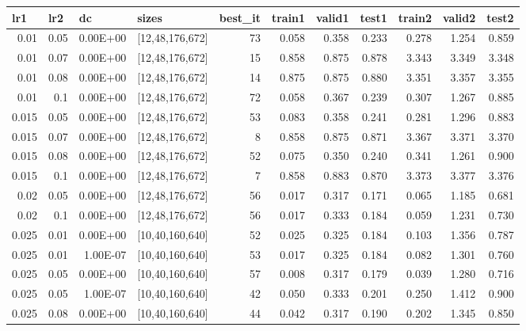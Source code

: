 \begin{table}[f]
\label{tab:results}
\small
\begin{tabular}{@{}rrrrrrrrrrr@{}}
\toprule
\multicolumn{1}{l}{lr1} & \multicolumn{1}{l}{lr2} & \multicolumn{1}{l}{dc} & \multicolumn{1}{l}{sizes} & \multicolumn{1}{l}{best\_it} & \multicolumn{1}{l}{train1} & \multicolumn{1}{l}{valid1} & \multicolumn{1}{l}{test1} & \multicolumn{1}{l}{train2} & \multicolumn{1}{l}{valid2} & \multicolumn{1}{l}{test2} \\ \midrule
0.01 & 0.05 & 0.00E+00 & {[}12,48,176,672{]} & 73 & 0.058 & 0.358 & 0.233 & 0.278 & 1.254 & 0.859 \\
0.01 & 0.07 & 0.00E+00 & {[}12,48,176,672{]} & 15 & 0.858 & 0.875 & 0.878 & 3.343 & 3.349 & 3.348 \\
0.01 & 0.08 & 0.00E+00 & {[}12,48,176,672{]} & 14 & 0.875 & 0.875 & 0.880 & 3.351 & 3.357 & 3.355 \\
0.01 & 0.1 & 0.00E+00 & {[}12,48,176,672{]} & 72 & 0.058 & 0.367 & 0.239 & 0.307 & 1.267 & 0.885 \\
0.015 & 0.05 & 0.00E+00 & {[}12,48,176,672{]} & 53 & 0.083 & 0.358 & 0.241 & 0.281 & 1.296 & 0.883 \\
0.015 & 0.07 & 0.00E+00 & {[}12,48,176,672{]} & 8 & 0.858 & 0.875 & 0.871 & 3.367 & 3.371 & 3.370 \\
0.015 & 0.08 & 0.00E+00 & {[}12,48,176,672{]} & 52 & 0.075 & 0.350 & 0.240 & 0.341 & 1.261 & 0.900 \\
0.015 & 0.1 & 0.00E+00 & {[}12,48,176,672{]} & 7 & 0.858 & 0.883 & 0.870 & 3.373 & 3.377 & 3.376 \\
0.02 & 0.05 & 0.00E+00 & {[}12,48,176,672{]} & 56 & 0.017 & 0.317 & 0.171 & 0.065 & 1.185 & 0.681 \\
0.02 & 0.1 & 0.00E+00 & {[}12,48,176,672{]} & 56 & 0.017 & 0.333 & 0.184 & 0.059 & 1.231 & 0.730 \\
0.025 & 0.01 & 0.00E+00 & {[}10,40,160,640{]} & 52 & 0.025 & 0.325 & 0.184 & 0.103 & 1.356 & 0.787 \\
0.025 & 0.01 & 1.00E-07 & {[}10,40,160,640{]} & 53 & 0.017 & 0.325 & 0.184 & 0.082 & 1.301 & 0.760 \\
0.025 & 0.05 & 0.00E+00 & {[}10,40,160,640{]} & 57 & 0.008 & 0.317 & 0.179 & 0.039 & 1.280 & 0.716 \\
0.025 & 0.05 & 1.00E-07 & {[}10,40,160,640{]} & 42 & 0.050 & 0.333 & 0.201 & 0.250 & 1.412 & 0.900 \\
0.025 & 0.08 & 0.00E+00 & {[}10,40,160,640{]} & 44 & 0.042 & 0.317 & 0.190 & 0.202 & 1.345 & 0.850 \\

\end{tabular}
\end{table}
